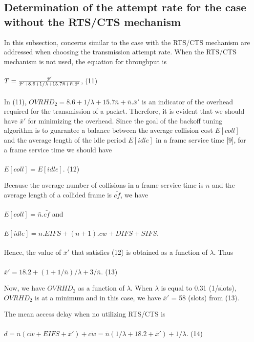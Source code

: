 \documentclass[10pt,twocolumn,oneside,submit]{JCNtran}
\begin{document}
\subsection{Determination of the attempt rate for the case without the RTS/CTS mechanism}
\par In this subsection, concerns similar to the case with the RTS/CTS mechanism are addressed when choosing the transmission attempt rate. When the RTS/CTS mechanism is not used, the equation for throughput is\\
\\
$T = {\bar x'\over\bar x'+8.6+1/\lambda +15.7\bar n+\bar n.\bar x'}$, \hfill(11) \\
\\
In (11), $OVRHD_2=8.6+1/\lambda +15.7\bar n+\bar n.\bar x'$ is an indicator of the overhead required for the transmission of a packet. Therefore, it is evident that we should have $\bar x'$ for minimizing the overhead. Since the goal of the backoff tuning algorithm is to guarantee a balance between the average collision cost $E[coll]$ and the average length of the idle period $E[idle]$ in a frame service time [9], for a frame service time we should have\\
\\
$E[coll]=E[idle]$. \hfill(12) \\
\par Because the average number of collisions in a frame service time is $\bar n$ and the average length of a collided frame is $\bar {cf}$, we have\\
\\
$E[coll]=\bar n.\bar {cf}$ and\\
\\
$E[idle]=\bar n.EIFS+(\bar n+1).\bar {cw}+DIFS+SIFS$.\\
\\
Hence, the value of $\bar x'$ that satisfies (12) is obtained as a function of $\lambda $. Thus\\
\\
$\bar x'=18.2+(1+1/\bar n)/\lambda +3/\bar n$. \hfill(13) \\
\par Now, we have $OVRHD_2$ as a function of $\lambda $. When $\lambda $ is equal to 0.31 (1/slots), $OVRHD_2$ is at a minimum and in this case, we have $\bar x'$ = 58 (slots) from (13).
\par The mean access delay when no utilizing RTS/CTS is\\
\\
$\bar d = \bar n(\bar {cw}+EIFS+\bar x')+\bar {cw} = \bar n(1/\lambda +18.2+\bar x')+1/\lambda $. \hfill(14) \\
\end{document}
